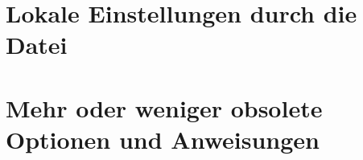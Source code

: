 \section{Lokale Einstellungen durch die Datei }


\section{Mehr oder weniger obsolete Optionen und Anweisungen}

%
\EndIndexGroup


